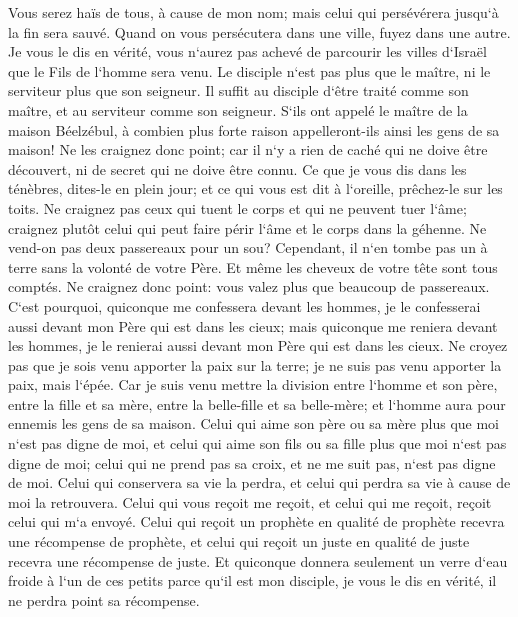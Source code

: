 \verse Vous serez haïs de tous, à cause de mon nom; mais celui qui persévérera jusqu`à la fin sera sauvé. 
\verse Quand on vous persécutera dans une ville, fuyez dans une autre. Je vous le dis en vérité, vous n`aurez pas achevé de parcourir les villes d`Israël que le Fils de l`homme sera venu. 
\verse Le disciple n`est pas plus que le maître, ni le serviteur plus que son seigneur. 
\verse Il suffit au disciple d`être traité comme son maître, et au serviteur comme son seigneur. S`ils ont appelé le maître de la maison Béelzébul, à combien plus forte raison appelleront-ils ainsi les gens de sa maison! 
\verse Ne les craignez donc point; car il n`y a rien de caché qui ne doive être découvert, ni de secret qui ne doive être connu. 
\verse Ce que je vous dis dans les ténèbres, dites-le en plein jour; et ce qui vous est dit à l`oreille, prêchez-le sur les toits. 
\verse Ne craignez pas ceux qui tuent le corps et qui ne peuvent tuer l`âme; craignez plutôt celui qui peut faire périr l`âme et le corps dans la géhenne. 
\verse Ne vend-on pas deux passereaux pour un sou? Cependant, il n`en tombe pas un à terre sans la volonté de votre Père. 
\verse Et même les cheveux de votre tête sont tous comptés. 
\verse Ne craignez donc point: vous valez plus que beaucoup de passereaux. 
\verse C`est pourquoi, quiconque me confessera devant les hommes, je le confesserai aussi devant mon Père qui est dans les cieux; 
\verse mais quiconque me reniera devant les hommes, je le renierai aussi devant mon Père qui est dans les cieux. 
\verse Ne croyez pas que je sois venu apporter la paix sur la terre; je ne suis pas venu apporter la paix, mais l`épée. 
\verse Car je suis venu mettre la division entre l`homme et son père, entre la fille et sa mère, entre la belle-fille et sa belle-mère; 
\verse et l`homme aura pour ennemis les gens de sa maison. 
\verse Celui qui aime son père ou sa mère plus que moi n`est pas digne de moi, et celui qui aime son fils ou sa fille plus que moi n`est pas digne de moi; 
\verse celui qui ne prend pas sa croix, et ne me suit pas, n`est pas digne de moi. 
\verse Celui qui conservera sa vie la perdra, et celui qui perdra sa vie à cause de moi la retrouvera. 
\verse Celui qui vous reçoit me reçoit, et celui qui me reçoit, reçoit celui qui m`a envoyé. 
\verse Celui qui reçoit un prophète en qualité de prophète recevra une récompense de prophète, et celui qui reçoit un juste en qualité de juste recevra une récompense de juste. 
\verse Et quiconque donnera seulement un verre d`eau froide à l`un de ces petits parce qu`il est mon disciple, je vous le dis en vérité, il ne perdra point sa récompense. 

